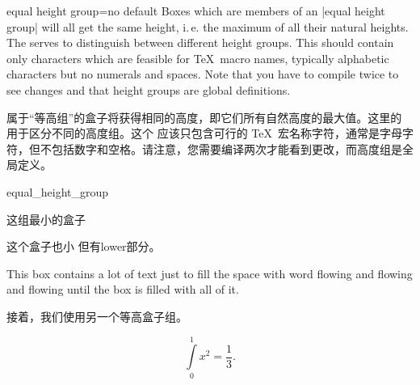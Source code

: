 \begin{docTcbKey}[][doc updated=2014-11-07]{equal height group}{=}{no default}
Boxes which are members of an |equal height group| will all get the
same height, i.\,e. the maximum of all their natural heights. The
 serves to distinguish between different height groups.
This  should contain only characters which are feasible
for \TeX\ macro names, typically alphabetic characters but no numerals
and spaces.
Note that you have to compile twice to see changes and
that height groups are global definitions.

属于“等高组”的盒子将获得相同的高度，即它们所有自然高度的最大值。这里的  用于区分不同的高度组。这个  应该只包含可行的 \TeX\ 宏名称字符，通常是字母字符，但不包括数字和空格。请注意，您需要编译两次才能看到更改，而高度组是全局定义。


\begin{exdispExample}[runs=2]{equal_height_group}

\begin{tcolorbox}[equal height group=A,adjusted title={一}]
这组最小的盒子
\end{tcolorbox}%
\begin{tcolorbox}[equal height group=A,adjusted title={二}]
这个盒子也小
\tcblower
但有lower部分。
\end{tcolorbox}%
\begin{tcolorbox}[equal height group=A,adjusted title={三}]
This box contains a lot of text just to fill the space
with word flowing and flowing and flowing until the box
is filled with all of it.
\end{tcolorbox}\linebreak


\begin{tcolorbox}[equal height group=B]
接着，我们使用另一个等高盒子组。
\end{tcolorbox}%
\begin{tcolorbox}[equal height group=B,after=]
\begin{equation*}
\int\limits_{0}^{1} x^2 = \frac13.
\end{equation*}
\end{tcolorbox}
\end{exdispExample}
\end{docTcbKey}


